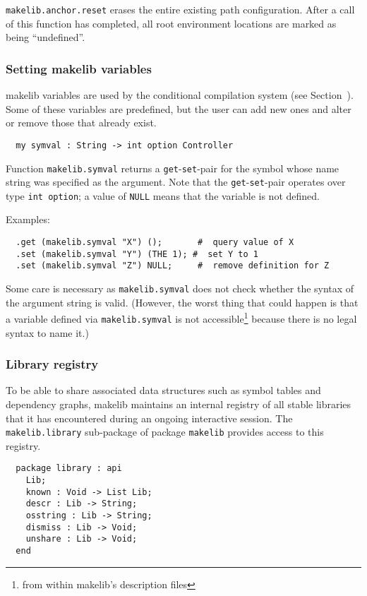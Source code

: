 {\tt makelib.anchor.reset} erases the entire existing path configuration.
After a call of this function has completed, all root environment
locations are marked as being ``undefined''.

\subsubsection{Setting makelib variables}

makelib variables are used by the conditional compilation system (see
Section~).  Some of these variables are predefined,
but the user can add new ones and alter or remove those that already
exist.

\begin{verbatim}
  my symval : String -> int option Controller
\end{verbatim}

Function {\tt makelib.symval} returns a {\tt get}-{\tt set}-pair for the
symbol whose name string was specified as the argument.  Note that the
{\tt get}-{\tt set}-pair operates over type {\tt int option}; a value
of {\tt NULL} means that the variable is not defined.

\noindent Examples:
\begin{verbatim}
  .get (makelib.symval "X") ();       #  query value of X 
  .set (makelib.symval "Y") (THE 1); #  set Y to 1 
  .set (makelib.symval "Z") NULL;     #  remove definition for Z 
\end{verbatim}

Some care is necessary as {\tt makelib.symval} does not check whether the
syntax of the argument string is valid.  (However, the worst thing
that could happen is that a variable defined via {\tt makelib.symval} is
not accessible\footnote{from within makelib's description files} because
there is no legal syntax to name it.)

\subsubsection{Library registry}
\label{sec:libreg}

To be able to share associated data structures such as symbol tables
and dependency graphs, makelib maintains an internal registry of all stable
libraries that it has encountered during an ongoing interactive
session.  The {\tt makelib.library} sub-package of package {\tt makelib}
provides access to this registry.

\begin{verbatim}
  package library : api
    Lib;
    known : Void -> List Lib;
    descr : Lib -> String;
    osstring : Lib -> String;
    dismiss : Lib -> Void;
    unshare : Lib -> Void;
  end
\end{verbatim}


